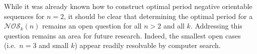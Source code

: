 \documentclass[a4paper,11pt]{article}
\theoremstyle{plain}
\theoremstyle{definition}
\theoremstyle{remark}
\begin{document}
While it was already known \cite[Note 3.12]{Mitchell25a} how to construct optimal period negative
orientable sequences for $n=2$, it should be clear that determining the optimal period for a
$\mathcal{NOS}_k(n)$ remains an open question for all $n>2$ and all $k$. Addressing this question
remains an area for future research.  Indeed, the smallest open cases (i.e.\ $n=3$ and small $k$)
appear readily resolvable by computer search.






%
%
%

\providecommand{\bysame}{\leavevmode\hbox to3em{\hrulefill}\thinspace}
\providecommand{\MR}{\relax\ifhmode\unskip\space\fi MR }
\providecommand{\MRhref}[2]{%
  \href{http://www.ams.org/mathscinet-getitem?mr=#1}{#2}
} \providecommand{\href}[2]{#2}
\end{document}
